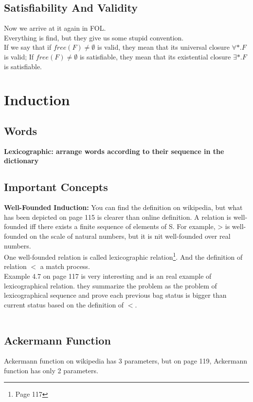 \documentclass{article}
\begin{document}
\subsection{Satisfiability And Validity}
Now we arrive at it again in FOL.\\
Everything is find, but they give us some stupid convention.\\
If we say that if $free(F) \neq \emptyset$ is valid, they mean that its universal closure $\forall *.F$ is valid; If $free(F) \neq \emptyset$ is satisfiable, they mean that its existential closure $\exists *.F$ is satisfiable.

\section{Induction}
\subsection{Words}
\textbf{Lexicographic: arrange words according to their sequence in the dictionary}\\


\subsection{Important Concepts}
\textbf{Well-Founded Induction: }You can find the definition on wikipedia, but what has been depicted on page 115 is clearer than online definition. A relation is well-founded iff there exists a finite sequence of elements of S. For example, > is well-founded on the scale of natural numbers, but it is nit well-founded over real numbers.\\
One well-founded relation is called lexicographic relation\footnote{Page 117}. And the definition of relation $<$ a match process.\\
Example 4.7 on page 117 is very interesting and is an real example of lexicographical relation. they summarize the problem as the problem of lexicographical sequence and prove each previous bag status is bigger than current status based on the definition of $<$.\\\\

\subsection{Ackermann Function}
Ackermann function on wikipedia has 3 parameters, but on page 119, Ackermann function has only 2 parameters.\\
\end{document}
